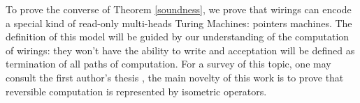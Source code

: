To prove the converse of Theorem \ref{soundness}, we prove that wirings can encode a special kind of read-only multi-heads Turing Machines: pointers machines.
The definition of this model will be guided by our understanding of the computation of wirings: they won't have the ability to write and acceptation will be defined as termination of all paths of computation.
For a survey of this topic, one may consult the first author's thesis \cite[Chap.4]{Aubert2013b}, the main novelty of this work is to prove that reversible computation is represented by isometric operators.



